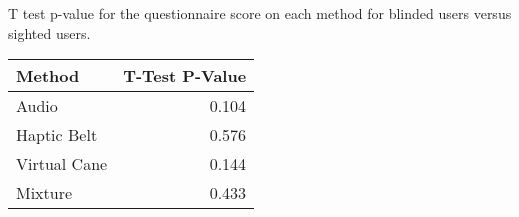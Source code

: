 
\centering
\caption{T test p-value for the questionnaire score on each method for blinded users versus sighted users.}
\label{tab:ttest_questionnaires}
\begin{tabular}{lr}
\toprule
      Method &  T-Test P-Value \\
\midrule
       Audio &           0.104 \\
 Haptic Belt &           0.576 \\
Virtual Cane &           0.144 \\
     Mixture &           0.433 \\
\bottomrule
\end{tabular}
